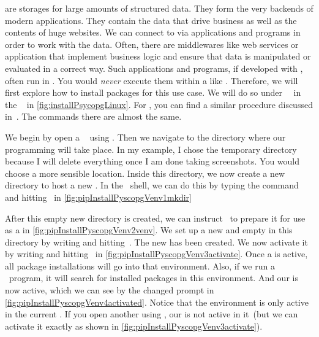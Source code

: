 %
 are storages for large amounts of structured data.
They form the very backends of modern applications.
They contain the data that drive business as well as the contents of huge websites.
We can connect to  via applications and programs in order to work with the data.
Often, there are middlewares like web services or application  that implement business logic and ensure that data is manipulated or evaluated in a correct way.
Such applications and programs, if developed with \python, often run in .
You would \emph{never} execute them within a  like \pycharm.%
%
%
%
Therefore, we will first explore how to install packages for this use case.
We will do so under \ubuntu\ \linux\ in the \bash\  in \cref{fig:installPsycopgLinux}.
For \microsoftWindows, you can find a similar procedure discussed in~\cite{programmingWithPython}.
The commands there are almost the same.

We begin by open a \bash\  using \ubuntuTerminal.
Then we navigate to the directory where our programming will take place.
In my example, I chose the temporary directory  because I will delete everything once I am done taking screenshots.
You would choose a more sensible location.
Inside this directory, we now create a new directory  to host a new .
In the \bash\ shell, we can do this by typing the command  and hitting~\keys{\return} in \cref{fig:pipInstallPyscopgVenv1mkdir}

After this empty new directory is created, we can instruct \python\ to prepare it for use as a  in \cref{fig:pipInstallPyscopgVenv2venv}.
We set up a new and empty  in this directory by writing  and hitting~\keys{\return}.
The new  has been created.
We now activate it by writing  and hitting~\keys{\return} in \cref{fig:pipInstallPyscopgVenv3activate}.
Once a  is active, all package installations will go into that environment.
Also, if we run a \python\ program, it will search for installed packages in this environment.
And our   is now active, which we can see by the changed prompt in \cref{fig:pipInstallPyscopgVenv4activated}.
Notice that the environment is only active in the current .
If you open another  using \ubuntuTerminal, our  is not active in it~(but we can activate it exactly as shown in \cref{fig:pipInstallPyscopgVenv3activate}).

